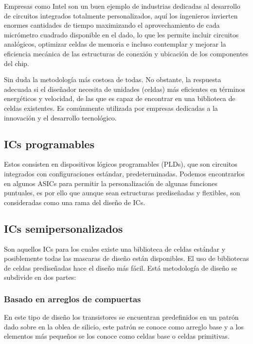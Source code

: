 {Empresas como Intel son un buen ejemplo de industrias dedicadas al desarrollo de circuitos integrados totalmente personalizados, aquí los ingenieros invierten enormes cantidades de tiempo maximizando el aprovechamiento de cada micrómetro cuadrado disponible en el dado, lo que les permite incluir circuitos analógicos, optimizar celdas de memoria e incluso contemplar y mejorar la eficiencia mecánica de las estructuras de conexión y ubicación de los componentes del chip.

Sin duda la metodología más costosa de todas. No obstante, la respuesta adecuada si el diseñador necesita de unidades (celdas) más eficientes en términos energéticos y velocidad, de las que es capaz de encontrar en una biblioteca de celdas existentes. Es comúnmente utilizada por empresas dedicadas a la innovación y el desarrollo tecnológico.

\subsection{\textbf{ICs programables}}

Estos consisten en dispositivos lógicos programables (PLDs), que son circuitos integrados con configuraciones estándar, predeterminadas. Podemos encontrarlos en algunos ASICs para permitir la personalización de algunas funciones puntuales, es por ello que aunque sean estructuras prediseñadas y flexibles, son consideradas como una rama del diseño de ICs.

\subsection{\textbf{ICs semipersonalizados}}

Son aquellos ICs para los cuales existe una biblioteca de celdas estándar y posiblemente todas las mascaras de diseño están disponibles. El uso de bibliotecas de celdas prediseñadas hace el diseño más fácil. Está metodología de diseño se subdivide en dos partes:

\subsubsection{Basado en arreglos de compuertas}

En este tipo de diseño los transistores se encuentran predefinidos en un patrón dado sobre en la oblea de silicio, este patrón se conoce como arreglo base y a los elementos más pequeños se los conoce como celdas base o celdas primitivas.

}
